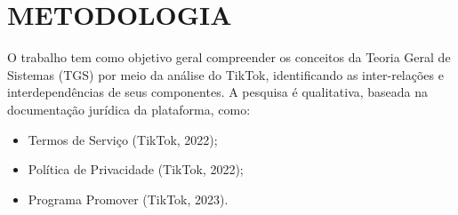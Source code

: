

\section{METODOLOGIA}

O trabalho tem como objetivo geral compreender os conceitos da Teoria Geral de Sistemas (TGS) por meio da análise do TikTok, identificando as inter-relações e interdependências de seus componentes. A pesquisa é qualitativa, baseada na documentação jurídica da plataforma, como:

\begin{itemize}
    \item Termos de Serviço (TikTok, 2022);
    \item Política de Privacidade (TikTok, 2022);
    \item Programa Promover (TikTok, 2023).
\end{itemize}




